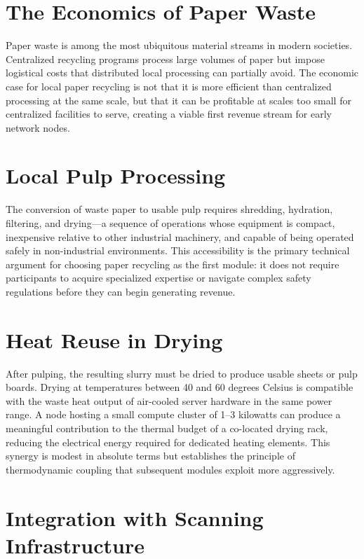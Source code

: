 \documentclass[12pt]{book}
\theoremstyle{definition}
\theoremstyle{remark}
\begin{document}
\section{The Economics of Paper Waste}

Paper waste is among the most ubiquitous material streams in modern
societies. Centralized recycling programs process large volumes of
paper but impose logistical costs that distributed local processing
can partially avoid. The economic case for local paper recycling is
not that it is more efficient than centralized processing at the
same scale, but that it can be profitable at scales too small for
centralized facilities to serve, creating a viable first revenue
stream for early network nodes.

\section{Local Pulp Processing}

The conversion of waste paper to usable pulp requires shredding,
hydration, filtering, and drying---a sequence of operations whose
equipment is compact, inexpensive relative to other industrial
machinery, and capable of being operated safely in non-industrial
environments. This accessibility is the primary technical argument
for choosing paper recycling as the first module: it does not require
participants to acquire specialized expertise or navigate complex
safety regulations before they can begin generating revenue.

\section{Heat Reuse in Drying}

After pulping, the resulting slurry must be dried to produce usable
sheets or pulp boards. Drying at temperatures between 40 and 60
degrees Celsius is compatible with the waste heat output of air-cooled
server hardware in the same power range. A node hosting a small
compute cluster of 1--3 kilowatts can produce a meaningful
contribution to the thermal budget of a co-located drying rack,
reducing the electrical energy required for dedicated heating elements.
This synergy is modest in absolute terms but establishes the
principle of thermodynamic coupling that subsequent modules exploit
more aggressively.

\section{Integration with Scanning Infrastructure}
\end{document}
